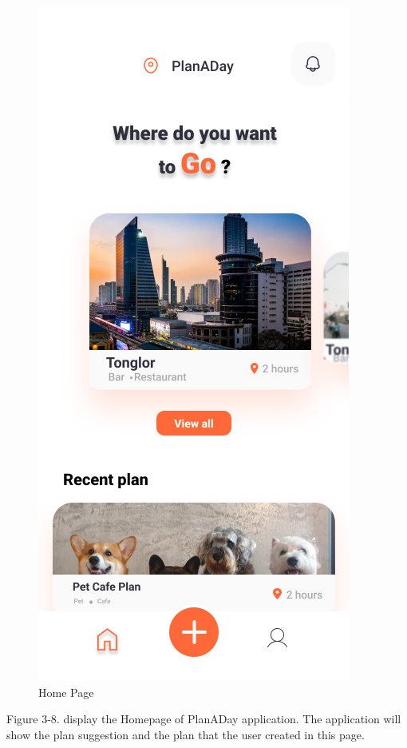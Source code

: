 \newpage
\begin{figure}[!h]
    \centering
    \includegraphics[width=1\linewidth]{chapter3/UI_Home_page.png}
    \caption{Home Page}
    \label{fig:Home Page}
\end{figure}
\noindent
Figure 3-8. display the Homepage of PlanADay application. The application will
show the plan suggestion and the plan that the user created in this page.


